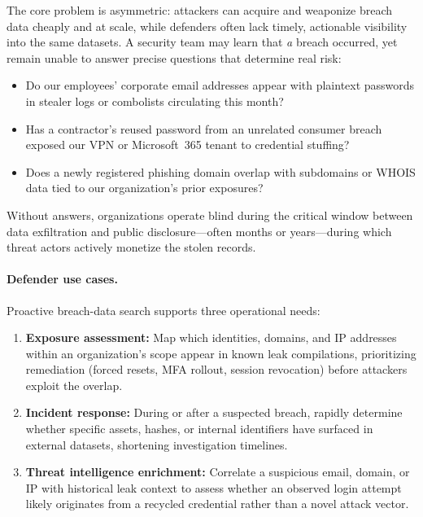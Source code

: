 The core problem is asymmetric: attackers can acquire and weaponize breach
data cheaply and at scale, while defenders often lack timely, actionable
visibility into the same datasets. A security team may learn that \emph{a}
breach occurred, yet remain unable to answer precise questions that determine
real risk:

\begin{itemize}[nosep]
  \item Do our employees' corporate email addresses appear with plaintext
        passwords in stealer logs or combolists circulating this month?
  \item Has a contractor's reused password from an unrelated consumer breach
        exposed our VPN or Microsoft~365 tenant to credential stuffing?
  \item Does a newly registered phishing domain overlap with subdomains or
        WHOIS data tied to our organization's prior exposures?
\end{itemize}

Without answers, organizations operate blind during the critical window between
data exfiltration and public disclosure---often months or years---during which
threat actors actively monetize the stolen records.

\paragraph{Defender use cases.}
Proactive breach-data search supports three operational needs:

\begin{enumerate}[nosep]
  \item \textbf{Exposure assessment:} Map which identities, domains, and IP
        addresses within an organization's scope appear in known leak
        compilations, prioritizing remediation (forced resets, MFA rollout,
        session revocation) before attackers exploit the overlap.
  \item \textbf{Incident response:} During or after a suspected breach,
        rapidly determine whether specific assets, hashes, or internal
        identifiers have surfaced in external datasets, shortening
        investigation timelines.
  \item \textbf{Threat intelligence enrichment:} Correlate a suspicious email,
        domain, or IP with historical leak context to assess whether an
        observed login attempt likely originates from a recycled credential
        rather than a novel attack vector.
\end{enumerate}

